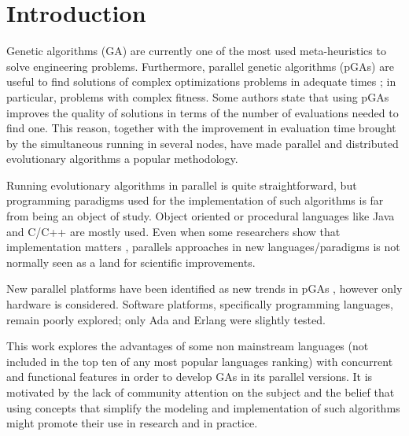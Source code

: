 \documentclass[sigconf]{acmart}
\begin{document}
\maketitle

\section{Introduction}

\noindent Genetic algorithms (GA) \cite{GA_Goldberg89} are currently
one of the most used meta-heuristics to solve engineering
problems. Furthermore, parallel genetic algorithms (pGAs) are useful
to find  solutions of complex optimizations problems in adequate times
\cite{Luque2011}; in particular, problems with complex fitness. Some
authors \cite{Alba2001} state that using pGAs improves the quality of
solutions in terms of the number of evaluations needed to find
one. This reason, together with the improvement in evaluation time
brought by the simultaneous running in several nodes, have made
parallel and distributed evolutionary algorithms a popular
methodology. 

Running evolutionary algorithms in parallel is quite straightforward, but programming paradigms used for the implementation of such algorithms is far from being an object of study. Object oriented or procedural languages like Java and C/C++ are mostly used. Even when some researchers show that implementation matters \cite{DBLP:conf/iwann/MereloRACML11}, parallels approaches in new languages/paradigms is not normally seen as a land for scientific improvements.

New parallel platforms have been identified as new trends in pGAs \cite{Luque2011}, however only hardware is considered. Software platforms, specifically programming languages, remain poorly explored; only Ada \cite{Santos2002} and Erlang \cite{A.Bienz2011,Kerdprasop2013} were slightly tested.


This work explores the advantages of some non mainstream languages (not included in the top ten of any most popular languages ranking) with concurrent and functional features in order to develop GAs in its parallel versions. It is motivated by the lack of community attention on the subject and the belief that using concepts that simplify the modeling and implementation of such algorithms might promote their use in research  and in practice.
\end{document}
